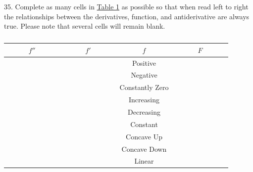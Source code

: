 \documentclass[10pt,oneside,]{book}
\theoremstyle{plain}
\theoremstyle{definition}
\numberwithin{equation}{section}
\newcounter{figstack}
\newlength\fight
\newcommand\pushValignCaptionBottom[5][b]{%
\stepcounter{figstack}%
\expandafter\def\csname %
figalign\romannumeral\value{figstack}\endcsname{#1}%
\expandafter\def\csname %
figtype\romannumeral\value{figstack}\endcsname{#2}%
\expandafter\def\csname %
figwd\romannumeral\value{figstack}\endcsname{#3}%
\expandafter\def\csname %
figcontent\romannumeral\value{figstack}\endcsname{#4}%
\expandafter\def\csname %
figcap\romannumeral\value{figstack}\endcsname{#5}%
\setbox0=\hbox{%
\begin{#2}{#3}#4\end{#2}}%
\ifdim\dimexpr\ht0+\dp0\relax>\fight\global\setlength{\fight}{%
\dimexpr\ht0+\dp0\relax}\fi%
}
\newcommand{\fd}[1]{#1'}
\newcommand{\sd}[1]{#1''}
\begin{document}
\par\smallskip\noindent
\begin{exerciselist}
\item[35.]\hypertarget{exercise-332}{\null}Complete as many cells in \hyperref[table-derivative-relations]{Table \ref{table-derivative-relations}} as possible so that when read left to right the relationships between the derivatives, function, and antiderivative are always true. Please note that several cells will remain blank.%
\begin{table}
\centering
\caption{\label{table-derivative-relations}}
\begin{tabular}{c|c|c|c}
\toprule
\(\sd{f}\)&\(\fd{f}\)&\(f\)&\(F\)\\
\midrule
\(\phantom{\text{Constantly Zero}}\)&\(\phantom{\text{Constantly Zero}}\)&Positive&\(\phantom{\text{Constantly Zero}}\)\\
\midrule
&&Negative&\\
\midrule
&&Constantly Zero&\\
\midrule
&&Increasing&\\
\midrule
&&Decreasing&\\
\midrule
&&Constant&\\
\midrule
&&Concave Up&\\
\midrule
&&Concave Down&\\
\midrule
&&Linear&\\
\bottomrule
\end{tabular}
\end{table}
\par\smallskip
\hypertarget{exercisegroup-69}{\null}
\end{exerciselist}
\end{document}
